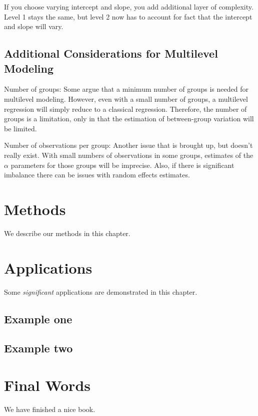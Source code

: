 \documentclass[]{book}
\begin{document}
If you choose varying intercept and slope, you add additional layer of
complexity. Level 1 stays the same, but level 2 now has to account for
fact that the intercept and slope will vary.

\section{Additional Considerations for Multilevel
Modeling}\label{additional-considerations-for-multilevel-modeling}

Number of groups: Some argue that a minimum number of groups is needed
for multilevel modeling. However, even with a small number of groups, a
multilevel regression will simply reduce to a classical regression.
Therefore, the number of groups is a limitation, only in that the
estimation of between-group variation will be limited.

Number of observations per group: Another issue that is brought up, but
doesn't really exist. With small numbers of observations in some groups,
estimates of the \(\alpha\) parameters for those groups will be
imprecise. Also, if there is significant imbalance there can be issues
with random effects estimates.

\chapter{Methods}\label{methods}

We describe our methods in this chapter.

\chapter{Applications}\label{applications}

Some \emph{significant} applications are demonstrated in this chapter.

\section{Example one}\label{example-one}

\section{Example two}\label{example-two}

\chapter{Final Words}\label{final-words}

We have finished a nice book.


\end{document}

